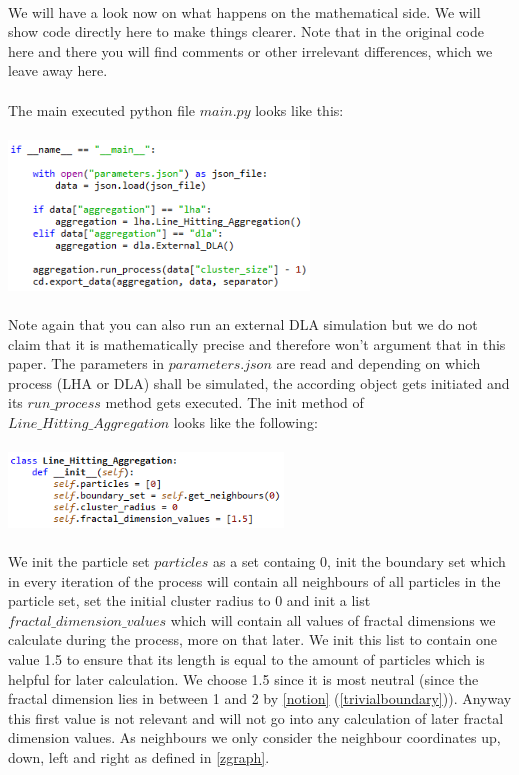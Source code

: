 \documentclass[12pt,a4paper]{scrartcl}
\numberwithin{equation}{subsection}
\newcommand{\1}{\mathbbm{1}}
\numberwithin{equation}{section}
\theoremstyle{definition}
\begin{document}
\\We will have a look now on what happens on the mathematical side. We will show code directly here to make things clearer. Note that in the original code here and there you will find comments or other irrelevant differences, which we leave away here. \\
\\The main executed python file $\mathit{main.py}$ looks like this:\\
\\
\includegraphics[height=4cm]{images/code-snippets/mainpy.png} \\
\\
Note again that you can also run an external DLA simulation but we do not claim that it is mathematically precise and therefore won't argument that in this paper. The parameters in $\mathit{parameters.json}$ are read and depending on which process (LHA or DLA) shall be simulated, the according object gets initiated and its $\mathit{run\_process}$ method gets executed. The init method of $\mathit{Line\_Hitting\_Aggregation}$ looks like the following:\\
\\
\includegraphics[height=2cm]{images/code-snippets/lhainit.png} \\
\\
We init the particle set $\mathit{particles}$ as a set containg $0$, init the boundary set which in every iteration of the process will contain all neighbours of all particles in the particle set, set the initial cluster radius to $0$ and init a list $\mathit{fractal\_dimension\_values}$ which will contain all values of fractal dimensions we calculate during the process, more on that later. We init this list to contain one value 1.5 to ensure that its length is equal to the amount of particles which is helpful for later calculation. We choose 1.5 since it is most neutral (since the fractal dimension lies in between 1 and 2 by \ref{notion} (\ref{trivialboundary})). Anyway this first value is not relevant and will not go into any calculation of later fractal dimension values. As neighbours we only consider the neighbour coordinates up, down, left and right as defined in \ref{zgraph}. \\
\end{document}
